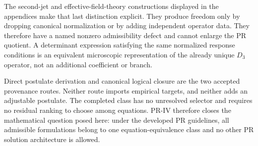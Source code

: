 The second-jet and effective-field-theory constructions displayed in the appendices make that last distinction explicit.  They produce freedom only by dropping canonical normalization or by adding independent operator data. They therefore have a named nonzero admissibility defect and cannot enlarge the PR quotient.  A determinant expression satisfying the same normalized response conditions is an equivalent microscopic representation of the already unique $D_3$ operator, not an additional coefficient or branch.

Direct postulate derivation and canonical logical closure are the two accepted provenance routes.  Neither route imports empirical targets, and neither adds an adjustable postulate.  The completed class has no unresolved selector and requires no residual ranking to choose among equations.  PR-IV therefore closes the mathematical question posed here: under the developed PR guidelines, all admissible formulations belong to one equation-equivalence class and no other PR solution architecture is allowed.
